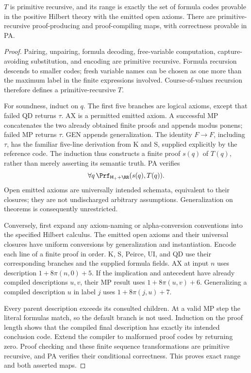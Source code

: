 \begin{theorem}\label{thm:stream}
$T$ is primitive recursive, and its range is exactly the set of formula codes provable in the positive Hilbert theory with the emitted open axioms. There are primitive-recursive proof-producing and proof-compiling maps, with correctness provable in PA.
\end{theorem}
\begin{proof}
Pairing, unpairing, formula decoding, free-variable computation, capture-avoiding substitution, and encoding are primitive recursive. Formula recursion descends to smaller codes; fresh variable names can be chosen as one more than the maximum label in the finite expressions involved. Course-of-values recursion therefore defines a primitive-recursive $T$.

For soundness, induct on $q$. The first five branches are logical axioms, except that failed QD returns $\tau$. AX is a permitted emitted axiom. A successful MP concatenates the two already obtained finite proofs and appends modus ponens; failed MP returns $\tau$. GEN appends generalization. The identity $F\to F$, including $\tau$, has the familiar five-line derivation from K and S, supplied explicitly by the reference code. The induction thus constructs a finite proof $s(q)$ of $T(q)$, rather than merely asserting its semantic truth. PA verifies
\[
                      \forall q\,\Prf_{\mathsf H_++\RR}(s(q),T(q)).
\]
Open emitted axioms are universally intended schemata, equivalent to their closures; they are not undischarged arbitrary assumptions. Generalization on theorems is consequently unrestricted.

Conversely, first expand any axiom-naming or alpha-conversion conventions into the specified Hilbert calculus. The emitted open axioms and their universal closures have uniform conversions by generalization and instantiation. Encode each line of a finite proof in order. K, S, Peirce, UI, and QD use their corresponding branches and the supplied formula fields. AX at input $n$ uses description $1+8\pi(n,0)+5$. If the implication and antecedent have already compiled descriptions $u,v$, their MP result uses $1+8\pi(u,v)+6$. Generalizing a compiled description $u$ in label $j$ uses $1+8\pi(j,u)+7$.

Every parent description exceeds its consulted children. At a valid MP step the literal formulas match, so the default branch is not used. Induction on the proof length shows that the compiled final description has exactly its intended conclusion code. Extend the compiler to malformed proof codes by returning zero. Proof checking and these finite sequence transformations are primitive recursive, and PA verifies their conditional correctness. This proves exact range and both asserted maps.
\end{proof}


